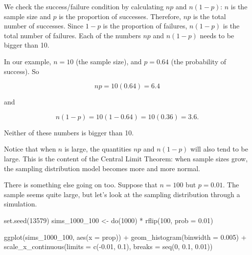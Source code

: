 \documentclass[
]{book}
\newenvironment{Shaded}{\begin{snugshade}}{\end{snugshade}}
\newcommand{\AttributeTok}[1]{\textcolor[rgb]{0.77,0.63,0.00}{#1}}
\newcommand{\DecValTok}[1]{\textcolor[rgb]{0.00,0.00,0.81}{#1}}
\newcommand{\FloatTok}[1]{\textcolor[rgb]{0.00,0.00,0.81}{#1}}
\newcommand{\FunctionTok}[1]{\textcolor[rgb]{0.00,0.00,0.00}{#1}}
\newcommand{\NormalTok}[1]{#1}
\newcommand{\OtherTok}[1]{\textcolor[rgb]{0.56,0.35,0.01}{#1}}
\newcommand{\SpecialCharTok}[1]{\textcolor[rgb]{0.00,0.00,0.00}{#1}}
\begin{document}
We check the success/failure condition by calculating \(np\) and \(n(1 - p)\): \(n\) is the sample size and \(p\) is the proportion of successes. Therefore, \(np\) is the total number of successes. Since \(1 - p\) is the proportion of failures, \(n(1 - p)\) is the total number of failures. Each of the numbers \(np\) and \(n(1 - p)\) needs to be bigger than 10.

In our example, \(n = 10\) (the sample size), and \(p = 0.64\) (the probability of success). So

\[
np = 10(0.64) = 6.4
\]

and

\[
n(1 - p) = 10(1 - 0.64) = 10(0.36) = 3.6.
\]

Neither of these numbers is bigger than 10.

Notice that when \(n\) is large, the quantities \(np\) and \(n(1 - p)\) will also tend to be large. This is the content of the Central Limit Theorem: when sample sizes grow, the sampling distribution model becomes more and more normal.

There is something else going on too. Suppose that \(n = 100\) but \(p = 0.01\). The sample seems quite large, but let's look at the sampling distribution through a simulation.

\begin{Shaded}
\begin{Highlighting}[]
\FunctionTok{set.seed}\NormalTok{(}\DecValTok{13579}\NormalTok{)}
\NormalTok{sims\_1000\_100 }\OtherTok{\textless{}{-}} \FunctionTok{do}\NormalTok{(}\DecValTok{1000}\NormalTok{) }\SpecialCharTok{*} \FunctionTok{rflip}\NormalTok{(}\DecValTok{100}\NormalTok{, }\AttributeTok{prob =} \FloatTok{0.01}\NormalTok{)}
\end{Highlighting}
\end{Shaded}

\begin{Shaded}
\begin{Highlighting}[]
\FunctionTok{ggplot}\NormalTok{(sims\_1000\_100, }\FunctionTok{aes}\NormalTok{(}\AttributeTok{x =}\NormalTok{ prop)) }\SpecialCharTok{+}
    \FunctionTok{geom\_histogram}\NormalTok{(}\AttributeTok{binwidth =} \FloatTok{0.005}\NormalTok{) }\SpecialCharTok{+}
    \FunctionTok{scale\_x\_continuous}\NormalTok{(}\AttributeTok{limits =} \FunctionTok{c}\NormalTok{(}\SpecialCharTok{{-}}\FloatTok{0.01}\NormalTok{, }\FloatTok{0.1}\NormalTok{),}
                       \AttributeTok{breaks =} \FunctionTok{seq}\NormalTok{(}\DecValTok{0}\NormalTok{, }\FloatTok{0.1}\NormalTok{, }\FloatTok{0.01}\NormalTok{))}
\end{Highlighting}
\end{Shaded}
\end{document}
